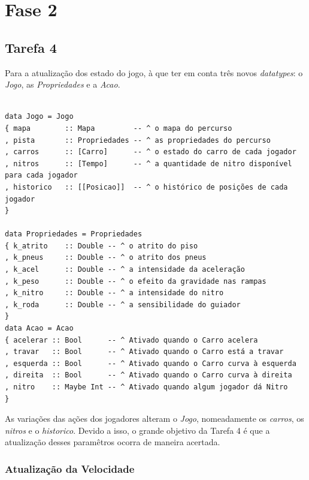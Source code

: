 \documentclass[a4paper]{report} %
\begin{document}
\newpage

\section {Fase 2}

\subsection{Tarefa 4}

Para a atualização dos estado do jogo, à que ter em conta três novos \textit{datatypes}: o \emph{Jogo}, as \emph{Propriedades} e a \emph{Acao}.

\begin{verbatim}

data Jogo = Jogo 
{ mapa        :: Mapa         -- ^ o mapa do percurso
, pista       :: Propriedades -- ^ as propriedades do percurso
, carros      :: [Carro]      -- ^ o estado do carro de cada jogador
, nitros      :: [Tempo]      -- ^ a quantidade de nitro disponível para cada jogador
, historico   :: [[Posicao]]  -- ^ o histórico de posições de cada jogador
}

data Propriedades = Propriedades
{ k_atrito    :: Double -- ^ o atrito do piso
, k_pneus     :: Double -- ^ o atrito dos pneus 
, k_acel      :: Double -- ^ a intensidade da aceleração
, k_peso      :: Double -- ^ o efeito da gravidade nas rampas
, k_nitro     :: Double -- ^ a intensidade do nitro
, k_roda      :: Double -- ^ a sensibilidade do guiador
}
data Acao = Acao 
{ acelerar :: Bool      -- ^ Ativado quando o Carro acelera
, travar   :: Bool      -- ^ Ativado quando o Carro está a travar
, esquerda :: Bool      -- ^ Ativado quando o Carro curva à esquerda
, direita  :: Bool      -- ^ Ativado quando o Carro curva à direita
, nitro    :: Maybe Int -- ^ Ativado quando algum jogador dá Nitro
}

\end{verbatim}

As variações das ações dos jogadores alteram o \emph{Jogo}, nomeadamente os \emph{carros}, os \emph{nitros} e o \emph{historico}. Devido a isso, o grande objetivo da Tarefa 4 é que a atualização desses paramêtros ocorra de maneira acertada.

\newpage

\subsubsection{Atualização da Velocidade}
\end{document}
